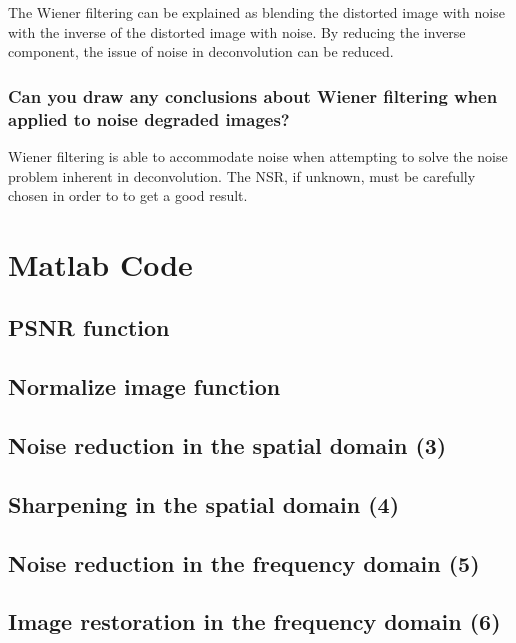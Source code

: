 \documentclass[article, 1.5space, letterpaper, 12pt, oneside, header, footer]{SydeClass}
\begin{document}
The Wiener filtering can be explained as blending the distorted image with noise with the inverse of the distorted image with noise. By reducing the inverse component, the issue of noise in deconvolution can be reduced.

\subsubsection{Can you draw any conclusions about Wiener filtering when applied to noise degraded images?}

Wiener filtering is able to accommodate noise when attempting to solve the noise problem inherent in deconvolution. The NSR, if unknown, must be carefully chosen in order to to get a good result.

\appendix
\newpage

\section{Matlab Code}


\subsection{PSNR function}


\subsection{Normalize image function}


\subsection{Noise reduction in the spatial domain (3)}


\subsection{Sharpening in the spatial domain (4)}


\subsection{Noise reduction in the frequency domain (5)}


\subsection{Image restoration in the frequency domain (6)}



\end{document}
